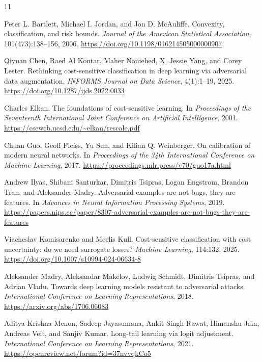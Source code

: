 \documentclass[11pt]{article}
\theoremstyle{definition}
\theoremstyle{plain}
\theoremstyle{remark}
\begin{document}
\begin{thebibliography}{11}

Peter L. Bartlett, Michael I. Jordan, and Jon D. McAuliffe.
\newblock Convexity, classification, and risk bounds.
\newblock \emph{Journal of the American Statistical Association}, 101(473):138--156, 2006.
\newblock \url{https://doi.org/10.1198/016214505000000907}

Qiyuan Chen, Raed Al Kontar, Maher Nouiehed, X. Jessie Yang, and Corey Lester.
\newblock Rethinking cost-sensitive classification in deep learning via adversarial data augmentation.
\newblock \emph{INFORMS Journal on Data Science}, 4(1):1--19, 2025.
\newblock \url{https://doi.org/10.1287/ijds.2022.0033}

Charles Elkan.
\newblock The foundations of cost-sensitive learning.
\newblock In \emph{Proceedings of the Seventeenth International Joint Conference on Artificial Intelligence}, 2001.
\newblock \url{https://cseweb.ucsd.edu/~elkan/rescale.pdf}

Chuan Guo, Geoff Pleiss, Yu Sun, and Kilian Q. Weinberger.
\newblock On calibration of modern neural networks.
\newblock In \emph{Proceedings of the 34th International Conference on Machine Learning}, 2017.
\newblock \url{https://proceedings.mlr.press/v70/guo17a.html}

Andrew Ilyas, Shibani Santurkar, Dimitris Tsipras, Logan Engstrom, Brandon Tran, and Aleksander Madry.
\newblock Adversarial examples are not bugs, they are features.
\newblock In \emph{Advances in Neural Information Processing Systems}, 2019.
\newblock \url{https://papers.nips.cc/paper/8307-adversarial-examples-are-not-bugs-they-are-features}

Viacheslav Komisarenko and Meelis Kull.
\newblock Cost-sensitive classification with cost uncertainty: do we need surrogate losses?
\newblock \emph{Machine Learning}, 114:132, 2025.
\newblock \url{https://doi.org/10.1007/s10994-024-06634-8}

Aleksander Madry, Aleksandar Makelov, Ludwig Schmidt, Dimitris Tsipras, and Adrian Vladu.
\newblock Towards deep learning models resistant to adversarial attacks.
\newblock \emph{International Conference on Learning Representations}, 2018.
\newblock \url{https://arxiv.org/abs/1706.06083}

Aditya Krishna Menon, Sadeep Jayasumana, Ankit Singh Rawat, Himanshu Jain, Andreas Veit, and Sanjiv Kumar.
\newblock Long-tail learning via logit adjustment.
\newblock \emph{International Conference on Learning Representations}, 2021.
\newblock \url{https://openreview.net/forum?id=37nvvqkCo5}


\end{thebibliography}
\end{document}
